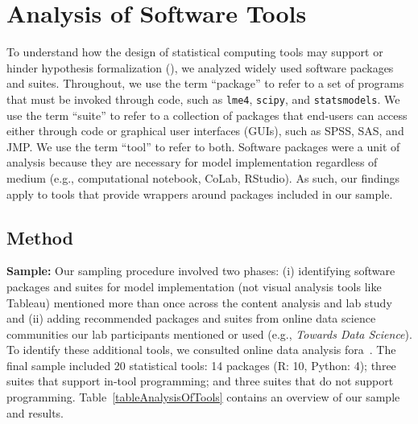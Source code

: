 \section{Analysis of Software Tools} \label{sec:toolsAnalysis}

To understand how the design of statistical computing tools may support or
hinder hypothesis formalization (\rqTools), we analyzed widely used software
packages and suites. Throughout, we use the term ``package'' to refer to a set
of programs that must be invoked through code, such as \texttt{lme4},
\texttt{scipy}, and \texttt{statsmodels}. We use the term ``suite'' to refer to
a collection of packages that end-users can access either through code or
graphical user interfaces (GUIs), such as SPSS, SAS, and JMP. We use the term
``tool'' to refer to both. Software packages were a unit of analysis because
they are necessary for model implementation regardless of medium (e.g.,
computational notebook, CoLab, RStudio). As such, our findings apply to tools
that provide wrappers around packages included in our sample.

\vspace{-2mm}
\subsection{Method}

\textbf{Sample:} Our sampling procedure involved two phases: (i)
identifying software packages and suites for model implementation (not visual analysis
tools like Tableau) mentioned more than once across the content analysis and lab
study and (ii) adding recommended packages and suites from online data science communities
our lab participants mentioned or used (e.g., \textit{Towards Data Science}). To
identify these additional tools, we consulted online data analysis
fora~\cite{grolemund2019:recommendedR, bobriakov2017:top15Python,
bobriakov2018:top20Python, prabhu2019:topPython}. The final sample included 20
statistical tools: 14 packages (R: 10, Python: 4); three suites that support
in-tool programming; and three suites that do not support programming.
Table~\ref{tableAnalysisOfTools} contains an overview of our sample and results.

